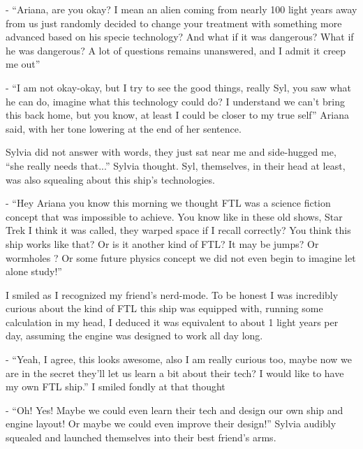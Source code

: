 \documentclass[hidelinks,12pt,a4paper]{book}
\begin{document}
- “Ariana, are you okay? I mean an alien coming from nearly 100 light years away from us just randomly decided to 
change your treatment with something more advanced based on his specie technology? And what if it was dangerous? 
What if he was dangerous? A lot of questions remains unanswered, and I admit it creep me out”\par
\bigskip

- “I am not okay-okay, but I try to see the good things, really Syl, you saw what he can do, imagine what this technology 
could do? I understand we can't bring this back home, but you know, at least I could be closer to my true self” 
Ariana said, with her tone lowering at the end of her sentence.\par
\bigskip

Sylvia did not answer with words, they just sat near me and side-hugged me, “she really needs that...” 
Sylvia thought. Syl, themselves, in their head at least, was also squealing about this ship's technologies.\par
\bigskip

- “Hey Ariana you know this morning we thought FTL was a science fiction concept that was impossible to achieve. 
You know like in these old shows, Star Trek I think it was called, they warped space if I recall correctly? You think 
this ship works like that? Or is it another kind of FTL? It may be jumps? Or wormholes ? Or some future physics concept
 we did not even begin to imagine let alone study!”\par
 \bigskip

I smiled as I recognized my friend's nerd-mode. To be honest I was incredibly curious about the kind of FTL this ship was 
equipped with, running some calculation in my head, I deduced it was equivalent to about 1 light years per day, assuming 
the engine was designed to work all day long.\par
\bigskip

- “Yeah, I agree, this looks awesome, also I am really curious too, maybe now we are in the secret they'll let us learn a bit 
about their tech? I would like to have my own FTL ship.” I smiled fondly at that thought\par
\bigskip

- “Oh! Yes! Maybe we could even learn their tech and design our own ship and engine layout! Or maybe we could even improve 
their design!” Sylvia audibly squealed and launched themselves into their best friend's arms.\par
\bigskip
\end{document}
